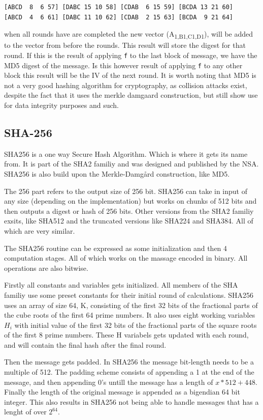 \documentclass[a4paper]{article}
\begin{document}
\begin{enumerate}
\begin{verbatim}
[ABCD  8  6 57] [DABC 15 10 58] [CDAB  6 15 59] [BCDA 13 21 60]
[ABCD  4  6 61] [DABC 11 10 62] [CDAB  2 15 63] [BCDA  9 21 64]
\end{verbatim}
when all rounds have are completed the new vector (A\textsubscript{1,B}\textsubscript{1,C}\textsubscript{1,D}\textsubscript{1}), will be added to the vector from before the rounds. This result will store the digest for that round. If this is the result of applying \texttt{f} to the last block of message, we have the MD5 digest of the message. Is this however result of applying \texttt{f} to any other block this result will be the IV of the next round.
It is worth noting that MD5 is not a very good hashing algorithm for cryptography, as collision attacks exist, despite the fact that it uses the merkle damgaard construction, but still show use for data integrity purposes and such.
\subsection{SHA-256}
\label{SHAalg}
SHA256 is a one way Secure Hash Algorithm. Which is where it gets its name from.
It is part of the SHA2 familiy and was designed and published by the NSA.
SHA256 is also build upon the Merkle-Damgård construction, like MD5.

The 256 part refers to the output size of 256 bit.
SHA256 can take in input of any size (depending on the implementation) but works
on chunks of 512 bits and then outputs a digest or hash of 256 bits.
Other versions from the SHA2 familiy exsits, like SHA512 and the truncated
versions like SHA224 and SHA384. All of which are very similar.

The SHA256 routine can be expressed as some initialization and then 4 computation stages.
All of which works on the massage encoded in binary. All operations are also bitwise.

Firstly all constants and variables gets initialized. All members of the SHA familiy use some preset constants for their initial round of calculations.
SHA256 uses an array of size 64, K, consisting of the first 32 bits of the fractional parts of the cube roots of the first 64 prime numbers.
It also uses eight working variables \(H_i\) with initial value of the first 32 bits of the fractional parts of the square roots of the first 8 prime numbers.
These H variabels gets updated with each round, and will contain the final hash after the final round.

Then the message gets padded. In SHA256 the message bit-length needs to be a multiple of 512.
The padding scheme consists of appending a 1 at the end of the message, and then appending 0's untill the message has a length of \(x*512+448\).
Finally the length of the original message is appended as a bigendian 64 bit integer.
This also results in SHA256 not being able to handle messages that has a lenght of over \(2^{64}\).


\end{enumerate}
\end{document}
